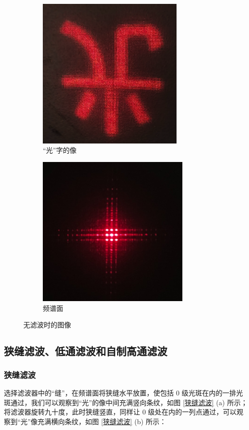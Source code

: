 \documentclass[UTF8]{article}
\theoremstyle{MyLineTheoremStyle} %
\theoremstyle{MyBlockTheoremStyle} %
\theoremstyle{MySubsubsectionStyle} %
\begin{document}
\begin{figure}[H]\centering
\begin{subfigure}[b]{0.5\columnwidth}\centering
    \includegraphics[height=215pt]{assets/1 阿贝尔/光 无滤波.png}
    \caption{“光”字的像}
\end{subfigure}\hfill
\begin{subfigure}[b]{0.5\columnwidth}\centering
    \includegraphics[height=215pt]{assets/1 阿贝尔/频谱面.jpg}
    \caption{频谱面}
\end{subfigure}
\caption{无滤波时的图像}
\label{无滤波时的图像}
\end{figure}

\subsection{狭缝滤波、低通滤波和自制高通滤波}

\subsubsection{狭缝滤波}

选择滤波器中的“缝”，在频谱面将狭缝水平放置，使包括 0 级光斑在内的一排光斑通过，我们可以观察到“光”的像中间充满竖向条纹，如图 \ref{狭缝滤波} (a) 所示；将滤波器旋转九十度，此时狭缝竖直，同样让 0 级处在内的一列点通过，可以观察到“光”像充满横向条纹，如图 \ref{狭缝滤波} (b) 所示：
\end{document}
